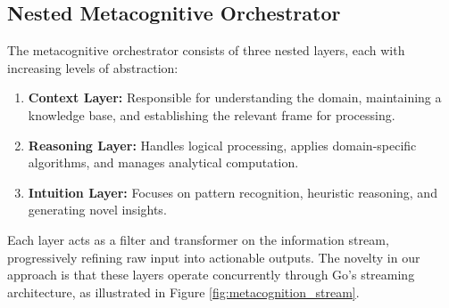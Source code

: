 \documentclass[11pt,a4paper,twocolumn]{article}
\begin{document}
\subsection{Nested Metacognitive Orchestrator}

The metacognitive orchestrator consists of three nested layers, each with increasing levels of abstraction:

\begin{enumerate}
    \item \textbf{Context Layer:} Responsible for understanding the domain, maintaining a knowledge base, and establishing the relevant frame for processing.
    \item \textbf{Reasoning Layer:} Handles logical processing, applies domain-specific algorithms, and manages analytical computation.
    \item \textbf{Intuition Layer:} Focuses on pattern recognition, heuristic reasoning, and generating novel insights.
\end{enumerate}

Each layer acts as a filter and transformer on the information stream, progressively refining raw input into actionable outputs. The novelty in our approach is that these layers operate concurrently through Go's streaming architecture, as illustrated in Figure \ref{fig:metacognition_stream}.
\end{document}
